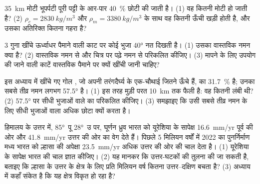 \begin{exercise}[$\star\star$]\label{exo:g12:mountain-building:10}
\qty{35}{km} मोटी भूपर्पटी पूरी पट्टी के आर-पार \qty{40}{\percent}
छोटी की जाती है। (1) वह कितनी मोटी हो जाती है? (2) $\rho_c =
\qty{2830}{kg/m^3}$ और $\rho_m = \qty{3380}{kg/m^3}$ के साथ वह कितनी ऊँची
खड़ी होती है, और उसका अतिरिक्त  कितना गहरा है?
\end{exercise}

\begin{exercise}[$\star\star$]\label{exo:g12:mountain-building:11}
3 गुना खींचे ऊर्ध्वाधर पैमाने वाली काट पर कोई भुजा \ang{40} नत
दिखती है। (1) उसका वास्तविक नमन क्या है? (2) वास्तविक
नमन से और चित्र पर पढ़े नमन से  परिकलित कीजिए। (3)  मापने के लिए
उपयोग की जाने वाली काटें वास्तविक पैमाने पर क्यों खींची जानी चाहिए?
\end{exercise}

\begin{exercise}[$\star\star\star$]\label{exo:g12:mountain-building:12}
इस अध्याय में खींचे गए गोल , जो अपनी तरंगदैर्घ्य के एक-चौथाई जितने
ऊँचे हैं, का  \qty{31.7}{\percent} है; उनका सबसे तीव्र नमन
लगभग \ang{57.5} है। (1) इस तरह मुड़ी परत \qty{10}{km} तक फैली है: वह कितनी लंबी
थी? (2) \ang{57.5} पर सीधी भुजाओं वाले  का  परिकलित
कीजिए। (3) समझाइए कि उसी सबसे तीव्र नमन के लिए सीधी भुजाओं वाला 
अधिक छोटा क्यों करता है।
\end{exercise}

\begin{exercise}[$\star\star\star$]\label{exo:g12:mountain-building:13}
हिमालय के उत्तर में, \ang{85}~पू \ang{28}~उ पर, घूर्णन ध्रुव भारत को
यूरेशिया के सापेक्ष \qty{16.6}{mm/yr} पूर्व की ओर और
\qty{41.8}{mm/yr} उत्तर की ओर का वेग देते हैं। पिछले 5 मिलियन वर्षों में 2022 का
पुनर्निर्माण मध्य भारत को ल्हासा की अपेक्षा \qty{23.5}{mm/yr}
अधिक उत्तर की ओर की चाल देता है। (1) यूरेशिया के सापेक्ष भारत की चाल
ज्ञात कीजिए। (2) यह मानकर कि उत्तर-घटकों की तुलना की जा सकती है, बताइए कि
ल्हासा के उत्तर के क्षेत्र के लिए प्रति मिलियन वर्ष कितना उत्तर--दक्षिण
 बचता है? (3) अध्याय में कहाँ संकेत है कि यह क्षेत्र विकृत हो रहा है?
\end{exercise}

